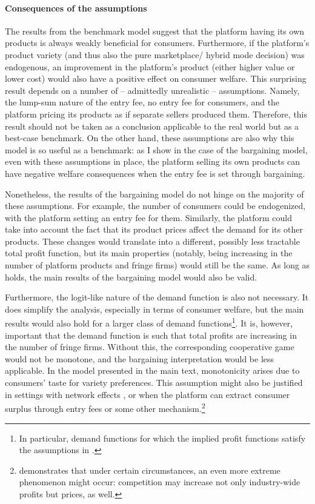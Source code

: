 \paragraph{Consequences of the assumptions}
The results from the benchmark model suggest that the platform having its own products is always weakly beneficial for consumers.
Furthermore, if the platform's product variety (and thus also the pure marketplace/ hybrid mode decision) was endogenous, an improvement in the platform's product (either higher value or lower cost) would also have a positive effect on consumer welfare.
This surprising result depends on a number of -- admittedly unrealistic -- assumptions.
Namely, the lump-sum nature of the entry fee, no entry fee for consumers, and the platform pricing its products as if separate sellers produced them.
Therefore, this result should not be taken as a conclusion applicable to the real world but as a best-case benchmark.
On the other hand, these assumptions are also why this model is so useful as a benchmark: as I show in the case of the bargaining model, even with these assumptions in place, the platform selling its own products can have negative welfare consequences when the entry fee is set through bargaining.

Nonetheless, the results of the bargaining model do not hinge on the majority of these assumptions.
For example, the number of consumers could be endogenized, with the platform setting an entry fee for them.
Similarly, the platform could take into account the fact that its product prices affect the demand for its other products.
These changes would translate into a different, possibly less tractable total profit function, but its main properties (notably, being increasing in the number of platform products and fringe firms) would still be the same.
As long as  holds, the main results of the bargaining model would also be valid.

Furthermore, the logit-like nature of the demand function is also not necessary.
It does simplify the analysis, especially in terms of consumer welfare, but the main results would also hold for a larger class of demand functions\footnote{
    In particular, demand functions for which the implied profit functions satisfy the assumptions in .
}.
It is, however, important that the demand function is such that total profits are increasing in the number of fringe firms.
Without this, the corresponding cooperative game would not be monotone, and the bargaining interpretation would be less applicable.
In the model presented in the main text, monotonicity arises due to consumers' taste for variety preferences.
This assumption might also be justified in settings with network effects \parencite{rochet2003platform}, or when the platform can extract consumer surplus through entry fees or some other mechanism.\footnote{
    \textcite{chen2008price} demonstrates that under certain circumstances, an even more extreme phenomenon might occur: competition may increase not only industry-wide profits but prices, as well.
}

